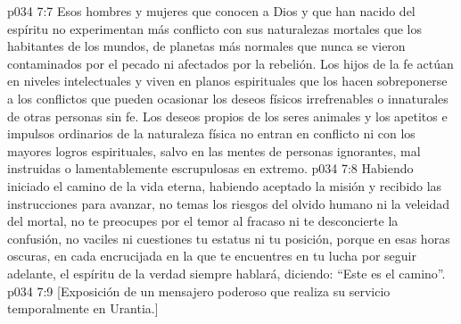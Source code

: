\vs p034 7:7 Esos hombres y mujeres que conocen a Dios y que han nacido del espíritu no experimentan más conflicto con sus naturalezas mortales que los habitantes de los mundos, de planetas más normales que nunca se vieron contaminados por el pecado ni afectados por la rebelión. Los hijos de la fe actúan en niveles intelectuales y viven en planos espirituales que los hacen sobreponerse a los conflictos que pueden ocasionar los deseos físicos irrefrenables o innaturales de otras personas sin fe. Los deseos propios de los seres animales y los apetitos e impulsos ordinarios de la naturaleza física no entran en conflicto ni con los mayores logros espirituales, salvo en las mentes de personas ignorantes, mal instruidas o lamentablemente escrupulosas en extremo.
\vs p034 7:8 \pc Habiendo iniciado el camino de la vida eterna, habiendo aceptado la misión y recibido las instrucciones para avanzar, no temas los riesgos del olvido humano ni la veleidad del mortal, no te preocupes por el temor al fracaso ni te desconcierte la confusión, no vaciles ni cuestiones tu estatus ni tu posición, porque en esas horas oscuras, en cada encrucijada en la que te encuentres en tu lucha por seguir adelante, el espíritu de la verdad siempre hablará, diciendo: “Este es el camino”.
\vsetoff
\vs p034 7:9 [Exposición de un mensajero poderoso que realiza su servicio temporalmente en Urantia.]

